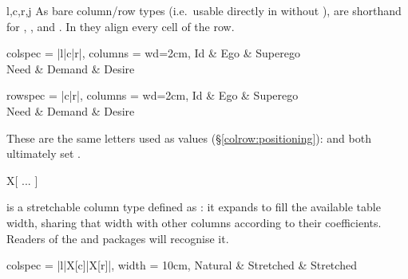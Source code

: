 \begin{codedescribe}[
    value,
    new=2021A,
    update=2021F,
    update=2021N
  ]{l,c,r,j}
  As bare column/row types (i.e.\ usable directly in  without ),  are shorthand for , ,  and . In  they align every cell of the row.

  \begin{codestore}[st=types:lcrj]
    \begin{tblr}{
        colspec = {|l|c|r|},
        columns = {wd=2cm},
      }
      Id   & Ego    & Superego \\
      Need & Demand & Desire
    \end{tblr}\quad
    \begin{tblr}{
        rowspec = {|c|r|},
        columns = {wd=2cm},
      }
      Id   & Ego    & Superego \\
      Need & Demand & Desire
    \end{tblr}\end{codestore}
  \begin{center}
  \end{center}
  \begin{tsremark}
    These are the same letters used as  values (\S\ref{colrow:positioning}):  and  both ultimately set .
  \end{tsremark}
\end{codedescribe}

\begin{codedescribe}[
    code,
    new=2021C
  ]{X[ ... ]}
  \begin{codesyntax}
    \tsverb{X[}\tsverb{]}
  \end{codesyntax}
   is a stretchable column type defined as : it expands to fill the available table width, sharing that width with other  columns according to their  coefficients. Readers of the  and  packages will recognise it.

  \begin{codestore}[st=types:x]
    \begin{tblr}{
      colspec = {|l|X[c]|X[r]|},
      width = 10cm,
      }
      Natural & Stretched & Stretched
    \end{tblr}\end{codestore}
  \begin{center}
  \end{center}
\end{codedescribe}

